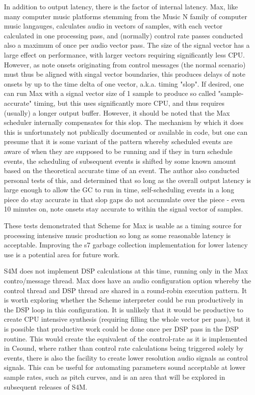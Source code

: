 \documentclass[acmsmall]{acmart}
\begin{document}
In addition to output latency, there is the factor of internal latency.
Max, like many computer music platforms stemming from the Music N family
of computer music langauges, calculates audio in vectors of samples, with
each vector calculated in one processing pass, and (normally) control
rate passes conducted also a maximum of once per audio vector pass. The
size of the signal vector has a large effect on performance, with larger
vectors requiring significantly less CPU. However, as note onsets originating
from control messages (the normal scenario) must thus be aligned with 
singal vector boundaries, this produces delays of note onsets by up to
the time delta of one vector, a.k.a. timing "slop". If desired, one
can run Max with a signal vector size of 1 sample to produce so called
"sample-accurate" timing, but this uses significantly more CPU, and thus
requires (usually) a longer output buffer. However, it should be noted
that the Max scheduler internally compensates for this slop. The mechanism
by which it does this is unfortunately not publically documented or available
in code, but one can presume that it is some variant of the pattern 
whereby scheduled events are aware of when they are supposed to be running
and if they in turn schedule events, the scheduling of subsequent events
is shifted by some known amount based on the theoretical accurate time
of an event. The author also conducted personal tests of this, and determined
that so long as the overall output latency is large enough to allow
the GC to run in time, self-scheduling events in a long piece do stay
accurate in that slop gaps do not accumulate over the piece - even
10 minutes on, note onsets stay accurate to within the signal vector
of samples.

These tests demonstrated that Scheme for Max is usable as a
timing source for processing intensive music production so long as some
reasonable latency is acceptable. Improving the s7 garbage collection
implementation for lower latency use is a potential area for future work. 

S4M does not implement DSP calculations at this time, running only in 
the Max contro/message thread. Max does have an audio configuration option
whereby the control thread and DSP thread are shared in a round-robin
execution pattern. It is worth exploring whether the Scheme interpreter
could be run productively in the DSP loop in this configuration. It is
unlikely that it would be productive to create CPU intensive synthesis
(requiring filling the whole vector per pass), but it is possible that
productive work could be done once per DSP pass in the DSP routine.
This would create the equivalent of the control-rate as it is implemented
in Csound, where rather than control rate calculations being triggered
solely by events, there is also the facility to create lower resolution
audio signals as control signals. This can be useful for automating parameters
sound acceptable at lower sample rates, such as pitch curves, and is
an area that will be explored in subsequent releases of S4M.
\end{document}
